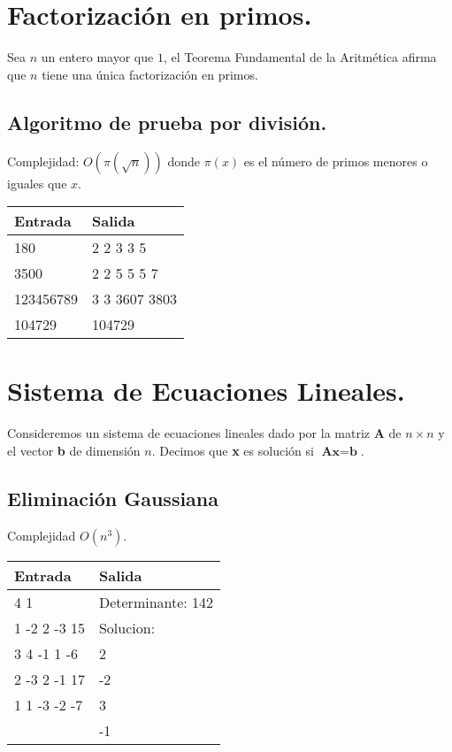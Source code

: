 \documentclass[12pt, letterpaper, twoside]{article}
\begin{document}
\newpage

\section{Factorización en primos.}

Sea $n$ un entero mayor que $1$, el Teorema Fundamental de la Aritmética afirma que $n$ tiene una única factorización en primos.

\subsection{Algoritmo de prueba por división.}

Complejidad: $O\left(\pi\left(\sqrt{n}\right)\right)$ donde $\pi(x)$ es el número de primos menores o iguales que $x$.

 \medskip

\begin{tabular}{|p{7cm}|p{7cm}|}
\hline
\textbf{Entrada} & \textbf{Salida}\\ \hline
180   & 2 2 3 3 5\\
3500  & 2 2 5 5 5 7\\ 
123456789 & 3 3 3607 3803\\
104729 & 104729\\ \hline
\end{tabular}

\newpage

\section{Sistema de Ecuaciones Lineales.}

Consideremos un sistema de ecuaciones lineales dado por la matriz \textbf{A} de $n \times n$ y el vector \textbf{b} de dimensión $n$. Decimos que \textbf{x} es solución si $\textbf{Ax} = \textbf{b}$.

\subsection{Eliminación Gaussiana}

Complejidad $O(n^3)$.

 \medskip

\begin{tabular}{|p{7cm}|p{7cm}|}
\hline
\textbf{Entrada} & \textbf{Salida}\\ \hline
4 1          & Determinante: 142\\
1 -2 2 -3 15 & Solucion:\\ 
3 4 -1 1 -6  & 2\\ 
2 -3 2 -1 17 & -2\\ 
1 1 -3 -2 -7 & 3\\ 
             & -1\\ \hline
\end{tabular}
\end{document}

